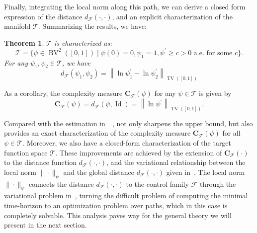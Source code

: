 \documentclass[12pt]{amsart}
\numberwithin{equation}{section}
\newtheorem{theorem}{Theorem}[section]
\theoremstyle{remark}
\newcommand{\ql}[1]{\texttt{\color{cyan} QL: \footnotesize #1}}
\begin{document}
Finally, integrating the local norm along this path, we can derive a closed form expression of the distance $d_{\mathcal F}(\cdot, \cdot)$, and an explicit characterization of the manifold $\mathcal T$. Summarizing the results, we have:
\begin{theorem}
    \label{thm:global_distance_1d_relu}
$\mathcal T$ is characterized as:
\begin{equation}
    \mathcal T = \{\psi\in \operatorname{BV}^2([0,1]) \mid \psi(0)=0, \psi_1 =1,  \psi^\prime \ge c > 0 \text{ a.e.}\text{ for some } c\}.
\end{equation}
For any $\psi_1, \psi_2\in \mathcal T$, we have
\begin{equation}
    \label{eq:global_distance_1d_relu}
    d_{\mathcal F}(\psi_1, \psi_2) =
    \left\|\ln \psi_1^{\prime}-\ln \psi_2^\prime \right\|_{\operatorname{TV}([0,1])}
\end{equation}
\end{theorem}

As a corollary, the complexity measure $\mathbf C_{\mathcal F}(\psi)$ for any $\psi\in \mathcal T$ is given by
\begin{equation}
    \mathbf C_{\mathcal F}(\psi) = d_{\mathcal F}(\psi, \operatorname{Id}) = \left\|\ln \psi^{\prime}\right\|_{\operatorname{TV}([0,1])}.
\end{equation}

Compared with the estimation in~~\cite{li2022deep},
 not only sharpens the upper bound, but also provides an exact characterization of the complexity measure $\mathbf C_{\mathcal F}(\psi)$ for all $\psi\in \mathcal T$. Moreover, we also have a closed-form characterization of the target function space $\mathcal T$.
These improvements are achieved by the extension of $\mathbf C_{\mathcal F}(\cdot)$ to the distance function $d_{\mathcal F}(\cdot, \cdot)$, and the variational relationship between the local norm $\|\cdot\|_{\psi}$ and the global distance $d_{\mathcal F}(\cdot, \cdot)$ given in~.
The local norm $\|\cdot\|_{\psi}$ connects the distance $d_{\mathcal F}(\cdot, \cdot)$ to the control family $\mathcal F$ through the variational problem in~, turning the difficult problem of computing
the minimal time-horizon to an optimization problem over paths,
which in this case is completely solvable.
This analysis paves way for the general theory we will present
in the next section.
\end{document}
